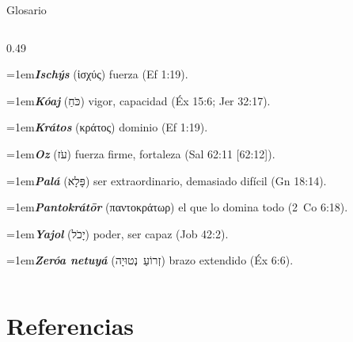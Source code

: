 \documentclass[hyperref={bookmarks=false},aspectratio=169]{beamer}
\newcommand{\heb}[1]{\mbox{\foreignlanguage{hebrew}{#1}}}
\newcommand{\grc}[1]{\foreignlanguage{ancientgreek}{#1}}
\begin{document}
\begin{frame}{Glosario}
\begin{columns}[t,onlytextwidth]
\begin{column}{0.49\textwidth}
\par\noindent\hangindent=1em{\color{azul}\textbf{\emph{Ischýs}}} (\grc{ἰσχύς}) fuerza (Ef 1:19).\par\vspace{2pt}
\par\noindent\hangindent=1em{\color{azul}\textbf{\emph{Kóaj}}} (\heb{כֹּחַ}) vigor, capacidad (Éx 15:6; Jer 32:17).\par\vspace{2pt}
\par\noindent\hangindent=1em{\color{azul}\textbf{\emph{Krátos}}} (\grc{κράτος}) dominio (Ef 1:19).\par\vspace{2pt}
\par\noindent\hangindent=1em{\color{azul}\textbf{\emph{Oz}}} (\heb{עֹז}) fuerza firme, fortaleza (Sal 62:11 [62:12]).\par\vspace{2pt}
\par\noindent\hangindent=1em{\color{azul}\textbf{\emph{Palá}}} (\heb{פָּלָא}) ser extraordinario, demasiado difícil (Gn 18:14).\par\vspace{2pt}
\par\noindent\hangindent=1em{\color{azul}\textbf{\emph{Pantokrátōr}}} (\grc{παντοκράτωρ}) el que lo domina todo (2~Co 6:18).\par\vspace{2pt}
\par\noindent\hangindent=1em{\color{azul}\textbf{\emph{Yajol}}} (\heb{יָכֹל}) poder, ser capaz (Job 42:2).\par\vspace{2pt}
\par\noindent\hangindent=1em{\color{azul}\textbf{\emph{Zeróa netuyá}}} (\heb{זְרוֹעַ נְטוּיָה}) brazo extendido (Éx 6:6).\par\vspace{2pt}

\end{column}
\end{columns}
\end{frame}

\section{Referencias}
\end{document}
